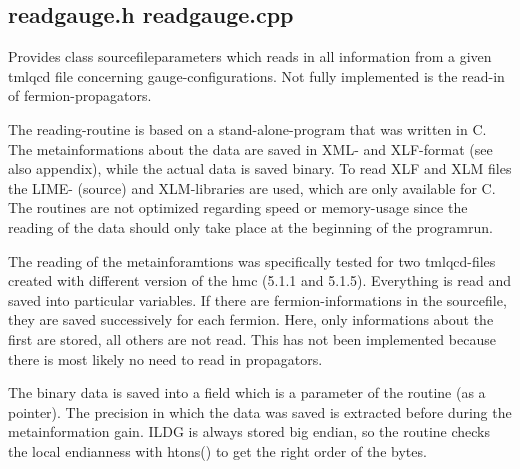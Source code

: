 
\subsection{readgauge.h readgauge.cpp}

Provides class sourcefileparameters which reads in all information from a given tmlqcd file concerning gauge-configurations. Not fully implemented is the read-in of fermion-propagators. 

The reading-routine is based on a stand-alone-program that was written in C. The metainformations about the data are saved in XML- and XLF-format (see also appendix), while the actual data is saved binary. To read XLF and XLM files the LIME- (source) and XLM-libraries are used, which are only available for C. The routines are not optimized regarding speed or memory-usage since the reading of the data should only take place at the beginning of the programrun.

The reading of the metainforamtions was specifically tested for two tmlqcd-files created with different version of the hmc (5.1.1 and 5.1.5). Everything is read and saved into particular variables. If there are fermion-informations in the sourcefile, they are saved successively for each fermion. Here, only informations about the first are stored, all others are not read. This has not been implemented because there is most likely no need to read in propagators.

The binary data is saved into a field which is a parameter of the routine (as a pointer). The precision in which the data was saved is extracted before during the metainformation gain. ILDG is always stored big endian, so the routine checks the local endianness with htons() to get the right order of the bytes.



